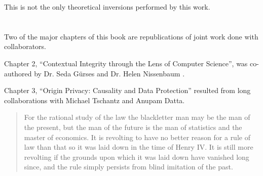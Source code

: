 \documentclass[../thesis.tex]{subfiles}
\begin{document}
 This is not the only theoretical inversions performed by this
 work.
 
 

 
 
 \section{}

 Two of the major chapters of this book are republications of joint work
 done with collaborators.

 Chapter 2, ``Contextual Integrity through the Lens of Computer Science'',
 was co-authored by Dr. Seda G{\"u}rses and Dr. Helen Nissenbaum \cite{benthall2017contextual}.

 Chapter 3, ``Origin Privacy: Causality and Data Protection'' resulted from
 long collaborations with Michael Tschantz and Anupam Datta. 



 
 \begin{quote}
 For the rational study of the law the blackletter man may be the man of the present, but the man of the future is the man of statistics and the master of economics. It is revolting to have no better reason for a rule of law than that so it was laid down in the time of Henry IV. It is still more revolting if the grounds upon which it was laid down have vanished long since, and the rule simply persists from blind imitation of the past. \cite{holmes1897path}
\end{quote}

 
\end{document}
